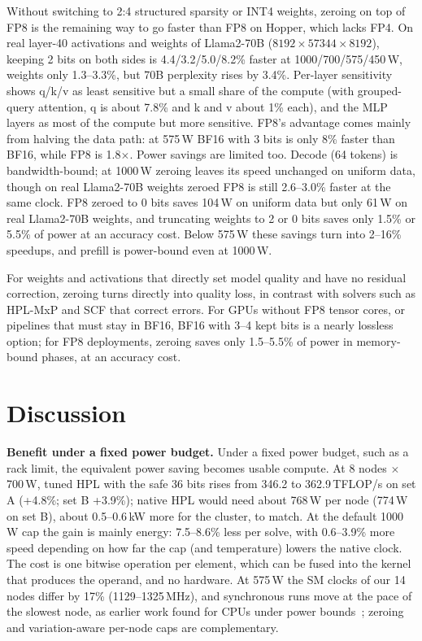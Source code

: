 \documentclass[conference]{IEEEtran}
\newcommand{\W}{\,W}
\newcommand{\pct}{\%}
\begin{document}
Without switching to 2:4 structured sparsity or INT4 weights, zeroing on top of FP8 is the remaining way to go faster
than FP8 on Hopper, which lacks FP4. On real layer-40 activations and weights of Llama2-70B
($8192{\times}57344{\times}8192$), keeping 2 bits on both sides is 4.4/3.2/5.0/8.2\pct{} faster at
1000/700/575/450\W, weights only 1.3--3.3\pct, but 70B perplexity rises by 3.4\pct. Per-layer sensitivity shows
q/k/v as least sensitive but a small share of the compute (with grouped-query attention, q is about 7.8\pct{} and k
and v about 1\pct{} each), and the MLP layers as most of the compute but more sensitive. FP8's
advantage comes mainly from halving the data path: at 575\W{} BF16 with 3 bits is only 8\pct{} faster than BF16,
while FP8 is 1.8$\times$. Power savings are limited too. Decode (64 tokens) is bandwidth-bound; at 1000\W{} zeroing
leaves its speed unchanged on uniform data, though on real Llama2-70B weights zeroed FP8 is still 2.6--3.0\pct{}
faster at the same clock. FP8 zeroed to 0 bits saves
104\W{} on uniform data but only 61\W{} on real Llama2-70B weights, and truncating weights to 2 or 0 bits saves only
1.5\pct{} or 5.5\pct{} of power at an accuracy cost. Below 575\W{} these savings turn into 2--16\pct{} speedups, and
prefill is power-bound even at 1000\W.

For weights and activations that directly set model quality and have no residual correction, zeroing turns directly
into quality loss, in contrast with solvers such as HPL-MxP and SCF that correct errors. For GPUs without FP8 tensor
cores, or pipelines that must stay in BF16, BF16 with 3--4 kept bits is a nearly lossless option; for FP8 deployments,
zeroing saves only 1.5--5.5\pct{} of power in memory-bound phases, at an accuracy cost.

\section{Discussion}\label{sec:discussion}

\textbf{Benefit under a fixed power budget.} Under a fixed power budget, such as a rack limit, the equivalent power
saving becomes usable compute. At 8 nodes $\times$ 700\W, tuned HPL with the safe 36 bits rises from 346.2 to
362.9\,TFLOP/s on set A (+4.8\pct; set B +3.9\pct); native HPL would need about 768\W{} per node (774\W{} on set B),
about 0.5--0.6\,kW more for the cluster, to match. At the default 1000\W{} cap the gain is mainly energy: 7.5--8.6\pct{}
less per solve, with 0.6--3.9\pct{} more speed depending on how far the cap (and temperature) lowers the native clock. The
cost is one bitwise operation per element, which can be fused into the kernel that produces the operand, and no
hardware. At 575\W{} the SM clocks of our 14 nodes differ by 17\pct{} (1129--1325\,MHz), and synchronous runs move at
the pace of the slowest node, as earlier work found for CPUs under power bounds~\cite{Rountree2012,Inadomi2015};
zeroing and variation-aware per-node caps are complementary.
\end{document}
